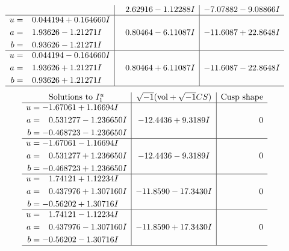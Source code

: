 \documentclass[1p]{elsarticle_modified}
\theoremstyle{definition}
\newcommand{\I}{\sqrt{-1}}
\begin{document}
$$\begin{array}{c|c|c}
 & \phantom{-}2.62916 - 1.12288 I & -7.07882 - 9.08866 I \\ \hline\begin{aligned}
u &= \phantom{-}0.044194 + 0.164660 I \\
a &= \phantom{-}1.93626 - 1.21271 I \\
b &= \phantom{-}0.93626 - 1.21271 I\end{aligned}
 & \phantom{-}0.80464 - 6.11087 I & -11.6087 + 22.8648 I \\ \hline\begin{aligned}
u &= \phantom{-}0.044194 - 0.164660 I \\
a &= \phantom{-}1.93626 + 1.21271 I \\
b &= \phantom{-}0.93626 + 1.21271 I\end{aligned}
 & \phantom{-}0.80464 + 6.11087 I & -11.6087 - 22.8648 I\\
 \hline 
 \end{array}$$\newpage$$\begin{array}{c|c|c}  
\text{Solutions to }I^u_{1}& \I (\text{vol} + \sqrt{-1}CS) & \text{Cusp shape}\\
 \hline 
\begin{aligned}
u &= -1.67061 + 1.16694 I \\
a &= \phantom{-}0.531277 - 1.236650 I \\
b &= -0.468723 - 1.236650 I\end{aligned}
 & -12.4436 + 9.3189 I & \phantom{-0.000000 } 0 \\ \hline\begin{aligned}
u &= -1.67061 - 1.16694 I \\
a &= \phantom{-}0.531277 + 1.236650 I \\
b &= -0.468723 + 1.236650 I\end{aligned}
 & -12.4436 - 9.3189 I & \phantom{-0.000000 } 0 \\ \hline\begin{aligned}
u &= \phantom{-}1.74121 + 1.12234 I \\
a &= \phantom{-}0.437976 + 1.307160 I \\
b &= -0.56202 + 1.30716 I\end{aligned}
 & -11.8590 - 17.3430 I & \phantom{-0.000000 } 0 \\ \hline\begin{aligned}
u &= \phantom{-}1.74121 - 1.12234 I \\
a &= \phantom{-}0.437976 - 1.307160 I \\
b &= -0.56202 - 1.30716 I\end{aligned}
 & -11.8590 + 17.3430 I & \phantom{-0.000000 } 0\\
 \hline 
 \end{array}$$\newpage\newpage\renewcommand{\arraystretch}{1}
\end{document}

